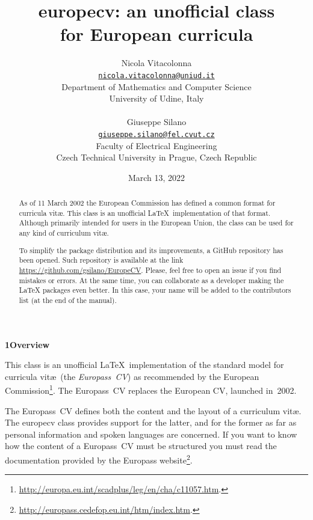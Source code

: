\documentclass{europecv}
\title{\textsf{europecv}: an unofficial class\\
	for European curricula}
\author{Nicola Vitacolonna\\
	\href{mailto:nicola.vitacolonna@uniud.it}{\texttt{nicola.vitacolonna@uniud.it}}\\
	Department of Mathematics and Computer Science\\
	University of Udine, Italy\\
	\\
	Giuseppe Silano\\
	\href{mailto:giuseppe.silano@fel.cvut.cz}{\texttt{giuseppe.silano@fel.cvut.cz}}\\
    Faculty of Electrical Engineering\\
    Czech Technical University in Prague, Czech Republic\\
}
\date{March 13, 2022}
\begin{document}

\maketitle

\pagestyle{plain}


\label{ABSTRACT}
\begin{abstract}

As of 11 March 2002 the European Commission has defined a common format for curricula vit\ae. This class is an unofficial \LaTeX\ implementation of that format. Although primarily intended for users in the European Union, the class can be used for any kind of curriculum vit\ae.

To simplify the package distribution and its improvements, a GitHub repository has been opened.
Such repository is available at the link \url{https://github.com/gsilano/EuropeCV}. Please, feel
free to open an issue if you find mistakes or errors. At the same time, you can collaborate as a
developer making the LaTeX packages even better. In this case, your name will be added to the
contributors list (at the end of the manual).

\end{abstract}



\label{Overview}
\vspace{0.25cm}
\textbf{\large{1\hspace{0.5cm}Overview}}
\vspace{0.25cm}

This class is an unofficial \LaTeX\ implementation of the standard model for curricula vit\ae\ (the
\emph{Europass~CV\/}) as recommended by the European
Commission\footnote{\url{http://europa.eu.int/scadplus/leg/en/cha/c11057.htm}.}. The Europass~CV
replaces the European CV, launched in~2002.

The Europass~CV defines both the content and the layout of a curriculum vit\ae. The
\textsf{europecv} class provides support for the latter, and for the former as far as personal
information and spoken languages are concerned. If you want to know how the content of a
Europass~CV must be structured you must read the documentation provided by the Europass
website\footnote{\url{http://europass.cedefop.eu.int/htm/index.htm}.}.
\end{document}
